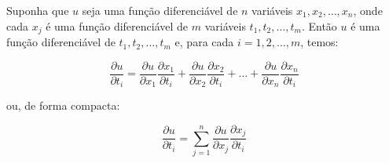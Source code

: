 \begin{theorem}
	Suponha que $u$ seja uma função diferenciável de $n$ variáveis $x_1, x_2, \dots, x_n$, onde cada $x_j$ é uma função diferenciável de $m$ variáveis $t_1, t_2, \dots, t_m$. Então $u$ é uma função diferenciável de $t_1, t_2, \dots, t_m$ e, para cada $i = 1, 2, \dots, m$, temos:
	
	\[
	\frac{\partial u}{\partial t_i} 
	= 
	\frac{\partial u}{\partial x_1} \frac{\partial x_1}{\partial t_i}
	+ \frac{\partial u}{\partial x_2} \frac{\partial x_2}{\partial t_i}
	+ \dots 
	+ \frac{\partial u}{\partial x_n} \frac{\partial x_n}{\partial t_i}
	\]
	
	ou, de forma compacta:
	
	\[
	\frac{\partial u}{\partial t_i} 
	= 
	\sum_{j=1}^{n} \frac{\partial u}{\partial x_j} \frac{\partial x_j}{\partial t_i}
	\]
\end{theorem}

